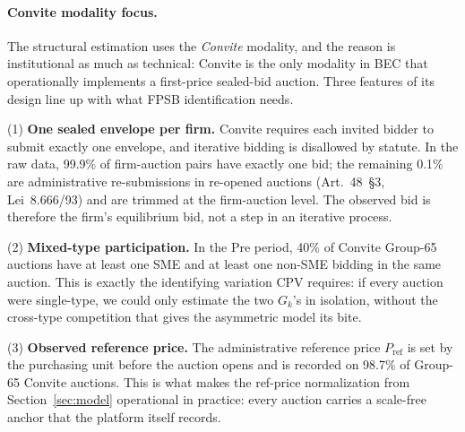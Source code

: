 \documentclass[12pt]{article}
\begin{document}
\paragraph{Convite modality focus.}
The structural estimation uses the \emph{Convite} modality, and
the reason is institutional as much as technical: Convite is the
only modality in BEC that operationally implements a first-price
sealed-bid auction. Three features of its design line up with
what FPSB identification needs.

\noindent(1) \textbf{One sealed envelope per firm.} Convite
requires each invited bidder to submit exactly one envelope, and
iterative bidding is disallowed by statute. In the raw data,
99.9\% of firm-auction pairs have exactly one bid; the remaining
0.1\% are administrative re-submissions in re-opened auctions
(Art.~48~\S3, Lei~8.666/93) and are trimmed at the firm-auction
level. The observed bid is therefore the firm's equilibrium bid,
not a step in an iterative process.

\noindent(2) \textbf{Mixed-type participation.} In the Pre period,
40\% of Convite Group-65 auctions have at least one SME and at
least one non-SME bidding in the same auction. This is exactly
the identifying variation CPV requires: if every auction were
single-type, we could only estimate the two $G_k$'s in isolation,
without the cross-type competition that gives the asymmetric
model its bite.

\noindent(3) \textbf{Observed reference price.} The administrative
reference price $P_{\text{ref}}$ is set by the purchasing unit
before the auction opens and is recorded on 98.7\% of Group-65
Convite auctions. This is what makes the ref-price normalization
from Section~\ref{sec:model} operational in practice: every
auction carries a scale-free anchor that the platform itself
records.
\end{document}
